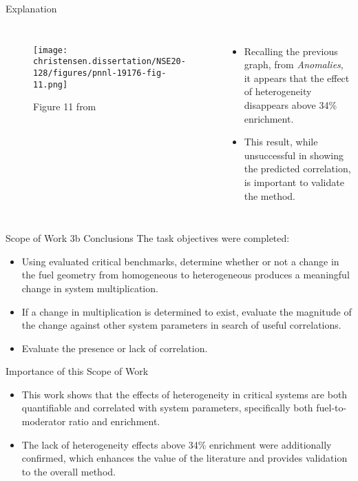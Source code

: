 \documentclass[10pt,aspectratio=169]{beamer}              %
\begin{document}
\begin{frame}{Explanation}
    \begin{columns}
            \begin{figure}
                \centering
                \texttt{[image: christensen.dissertation/NSE20-128/figures/pnnl-19176-fig-11.png]}
                \caption{Figure 11 from }
            \end{figure}
        \begin{itemize}
            \item Recalling the previous graph, from \textit{Anomalies}, it appears that the effect of heterogeneity disappears above 34\% enrichment.
            \item This result, while unsuccessful in showing the predicted correlation, is important to validate the method.
        \end{itemize}
    \end{columns}
\end{frame}

\begin{frame}{Scope of Work 3b Conclusions}
The task objectives were completed:
    \begin{itemize}
        \item Using evaluated critical benchmarks, determine whether or not a change in the fuel geometry from homogeneous to heterogeneous produces a meaningful change in system multiplication.
        \item If a change in multiplication is determined to exist, evaluate the magnitude of the change against other system parameters in search of useful correlations.
        \item Evaluate the presence or lack of correlation.
    \end{itemize}
    \begin{alertblock}{Importance of this Scope of Work}
        \begin{itemize}
            \item This work shows that the effects of heterogeneity in critical systems are both quantifiable and correlated with system parameters, specifically both fuel-to-moderator ratio and enrichment.
            \item The lack of heterogeneity effects above 34\% enrichment were additionally confirmed, which enhances the value of the literature and provides validation to the overall method.
        \end{itemize}
    \end{alertblock}
    \note[item]{}
\end{frame}
\end{document}
